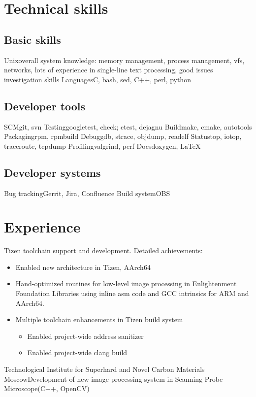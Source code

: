 \documentclass[11pt,a4paper]{moderncv}
\begin{document}
\makecvtitle
\section{Technical skills}
\label{sec:skills}
\subsection{Basic skills}
\cvline
  {Unix}{overall system knowledge: memory management, process management, vfs, networks,\linebreak{} lots of experience in single-line text processing, good issues investigation skills}
\cvline
  {Languages}{C, bash, sed, C++, perl, python}
\subsection{Developer tools}
\cvdoubleitem
  {SCM}{git, svn}
  {Testing}{googletest, check; ctest, dejagnu}
\cvdoubleitem
  {Build}{make, cmake, autotools}
  {Packaging}{rpm, rpmbuild}
\cvdoubleitem
  {Debug}{gdb, strace, objdump, readelf}
  {Status}{top, iotop, traceroute, tcpdump}
\cvdoubleitem
  {Profiling}{valgrind, perf}
  {Docs}{doxygen, \LaTeX}
\subsection{Developer systems}
\cvdoubleitem
  {Bug tracking}{Gerrit, Jira, Confluence}
  {Build system}{OBS}

\section{Experience}
\label{sec:exp}
        {Tizen toolchain support and development.\newline{}
Detailed achievements:
\begin{itemize}
\item Enabled new architecture in Tizen, AArch64\footnotemark[1]
\item Hand-optimized routines for low-level image processing in Enlightenment
      Foundation Libraries using inline asm code and GCC intrinsics for ARM and
      AArch64.\footnotemark[2]
\item Multiple toolchain enhancements in Tizen build system\footnotemark[3]
  \begin{itemize}
    \item Enabled project-wide address sanitizer\footnotemark[4]
    \item Enabled project-wide clang build
  \end{itemize}
\end{itemize}}
        {Technological Institute for Superhard and Novel Carbon Materials}
        {Moscow}{}{Development of new image processing system in
                   Scanning Probe Microscope(C++, OpenCV)}
\end{document}
